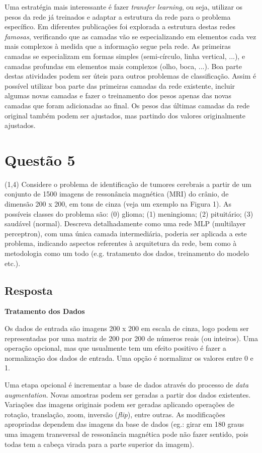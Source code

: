 \documentclass[final,3p]{elsarticle}
\numberwithin{equation}{section}
\begin{document}
        Uma estratégia mais interessante é fazer \emph{transfer learning}, ou seja, utilizar os pesos da rede já treinados e adaptar a estrutura da rede para o problema específico. Em diferentes publicações foi explorada a estrutura destas redes \emph{famosas}, verificando que as camadas vão se especializando em elementos cada vez mais complexos à medida que a informação segue pela rede. As primeiras camadas se especializam em formas simples (semi-círculo, linha vertical, ...), e camadas profundas em elementos mais complexos (olho, boca, ...). Boa parte destas atividades podem ser úteis para outros problemas de classificação. Assim é possível utilizar boa parte das primeiras camadas da rede existente, incluir algumas novas camadas e fazer o treinamento dos pesos apenas das novas camadas que foram adicionadas ao final. Os pesos das últimas camadas da rede original também podem ser ajustados, mas partindo dos valores originalmente ajustados.

\section{Questão 5}

    (1,4) Considere o problema de identificação de tumores cerebrais a partir de um conjunto de 1500 imagens de ressonância magnética (MRI) do crânio, de dimensão 200 x 200, em tons de cinza (veja um exemplo na Figura 1).
    As possíveis classes do problema são: (0) glioma; (1) meningioma; (2) pituitário; (3) saudável (normal). Descreva detalhadamente como uma rede MLP (multilayer perceptron), com uma única camada intermediária, poderia ser aplicada a este problema, indicando aspectos referentes à arquitetura da rede, bem como à metodologia como um todo (e.g. tratamento dos dados, treinamento do modelo etc.).

    \subsection{Resposta}

        \noindent \textbf{Tratamento dos Dados}

        Os dados de entrada são imagens 200 x 200 em escala de cinza, logo podem ser representadas por uma matriz de 200 por 200 de números reais (ou inteiros). Uma operação opcional, mas que usualmente tem um efeito positivo é fazer a normalização dos dados de entrada. Uma opção é normalizar os valores entre 0 e 1.

        Uma etapa opcional é incrementar a base de dados através do processo de \emph{data augmentation}. Novas amostras podem ser geradas a partir dos dados existentes. Variações das imagens originais podem ser geradas aplicando operações de rotação, translação, zoom, inversão (\emph{flip}), entre outras. As modificações apropriadas dependem das imagens da base de dados (eg.: girar em 180 graus uma imagem transversal de ressonância magnética pode não fazer sentido, pois todas tem a cabeça virada para a parte superior da imagem).
\end{document}
